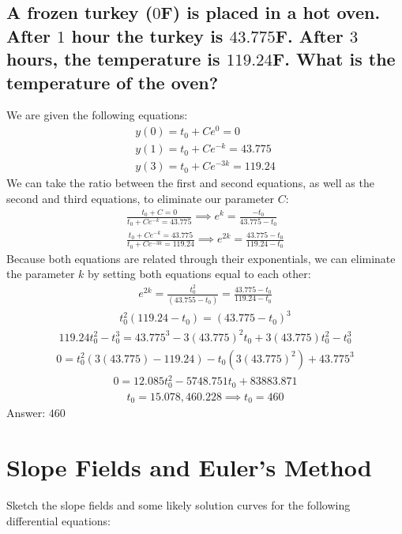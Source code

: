 \documentclass{article}
\begin{document}
\subsection{A frozen turkey ($0$F) is placed in a hot oven. After $1$ hour the turkey is $43.775$F. After $3$ hours, the temperature is $119.24$F. What is the temperature of the oven?}
We are given the following equations:
\begin{align*}
	y(0) = t_0 + Ce^0 = 0 \\
	y(1) = t_0 + Ce^{-k} = 43.775 \\
	y(3) = t_0 + Ce^{-3k} = 119.24
\end{align*}
We can take the ratio between the first and second equations, as well as the second and third equations, to eliminate our parameter $C$:
\begin{align*}
	\frac{t_0 + C = 0}{t_0 + Ce^{-k} = 43.775} \implies e^k = \frac{-t_0}{43.775 - t_0} \\
	\frac{t_0 + Ce^{-k} = 43.775}{t_0 + Ce^{-3k} = 119.24} \implies e^{2k} = \frac{43.775 - t_0}{119.24 - t_0}
\end{align*}
Because both equations are related through their exponentials, we can eliminate the parameter $k$ by setting both equations equal to each other:
\begin{align*}
	e^{2k} = \frac{t_0^2}{(43.755 - t_0)} = \frac{43.775 - t_0}{119.24 - t_0}
\end{align*}
\begin{align*}
	t_0^2(119.24 - t_0) = (43.775 - t_0)^3
\end{align*}
\begin{align*}
	119.24 t_0^2 - t_0^3 = 43.775^3 - 3(43.775)^2 t_0 + 3(43.775)t_0^2 - t_0^3
\end{align*}
\begin{align*}
	0 = t_0^2 (3(43.775)-119.24) - t_0 (3(43.775)^2) + 43.775^3
\end{align*}
\begin{align*}
	0 = 12.085 t_0^2 - 5748.751 t_0 + 83883.871
\end{align*}
\begin{align*}
	t_0 = 15.078, 460.228 \implies t_0 = 460
\end{align*}
Answer: $460$

\section{Slope Fields and Euler's Method}

Sketch the slope fields and some likely solution curves for the following differential equations:
\end{document}
